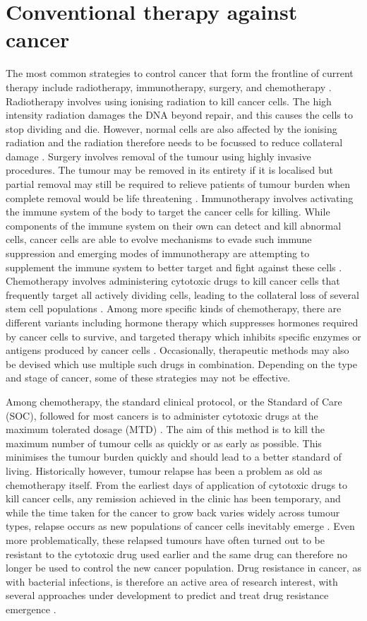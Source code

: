 \section{Conventional therapy against cancer}
The most common strategies to control cancer that form the frontline of current therapy include radiotherapy, immunotherapy, surgery, and chemotherapy \cite{cancer_therapy}. Radiotherapy involves using ionising radiation to kill cancer cells. The high intensity radiation damages the DNA beyond repair, and this causes the cells to stop dividing and die. However, normal cells are also affected by the ionising radiation and the radiation therefore needs to be focussed to reduce collateral damage \cite{Ahmad}. Surgery involves removal of the tumour using highly invasive procedures. The tumour may be removed in its entirety if it is localised but partial removal may still be required to relieve patients of tumour burden when complete removal would be life threatening \cite{Wyld}. Immunotherapy involves activating the immune system of the body to target the cancer cells for killing. While components of the immune system on their own can detect and kill abnormal cells, cancer cells are able to evolve mechanisms to evade such immune suppression and emerging modes of immunotherapy are attempting to supplement the immune system to better target and fight against these cells \cite{Frankel}. Chemotherapy involves administering cytotoxic drugs to kill cancer cells that frequently target all actively dividing cells, leading to the collateral loss of several stem cell populations \cite{DeVita}. Among more specific kinds of chemotherapy, there are different variants including hormone therapy which suppresses hormones required by cancer cells to survive, and targeted therapy which inhibits specific enzymes or antigens produced by cancer cells \cite{Sawyers,Whitmore}. Occasionally, therapeutic methods may also be devised which use multiple such drugs in combination. Depending on the type and stage of cancer, some of these strategies may not be effective.

Among chemotherapy, the standard clinical protocol, or the Standard of Care (SOC), followed for most cancers is to administer cytotoxic drugs at the maximum tolerated dosage (MTD) \cite{Frei}. The aim of this method is to kill the maximum number of tumour cells as quickly or as early as possible. This minimises the tumour burden quickly and should lead to a better standard of living. Historically however, tumour relapse has been a problem as old as chemotherapy itself. From the earliest days of application of cytotoxic drugs to kill cancer cells, any remission achieved in the clinic has been temporary, and while the time taken for the cancer to grow back varies widely across tumour types, relapse occurs as new populations of cancer cells inevitably emerge \cite{Schilder,Baniel}. Even more problematically, these relapsed tumours have often turned out to be resistant to the cytotoxic drug used earlier and the same drug can therefore no longer be used to control the new cancer population. Drug resistance in cancer, as with bacterial infections, is therefore an active area of research interest, with several approaches under development to predict and treat drug resistance emergence \cite{Mokhtari,Gao,Hall}.


